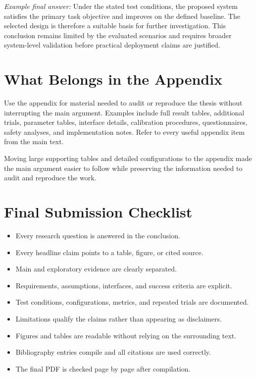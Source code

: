 \documentclass[a4paper,11pt,oneside]{article}
\begin{document}
  \textit{Example final answer:}
  Under the stated test conditions, the proposed system satisfies the primary
  task objective and improves on the defined baseline. The selected design is
  therefore a suitable basis for further investigation. This conclusion remains
  limited by the evaluated scenarios and requires broader system-level
  validation before practical deployment claims are justified.

  \newpage
  \nocite{siciliano2016springer,thrun2005probabilistic,russell2021artificial}
  \printbibliography

  \clearpage
  \appendix

  \section{What Belongs in the Appendix}

  \begin{guidance}
  Use the appendix for material needed to audit or reproduce the thesis without
  interrupting the main argument. Examples include full result tables,
  additional trials, parameter tables, interface details, calibration
  procedures, questionnaires, safety analyses, and implementation notes. Refer
  to every useful appendix item from the main text.
  \end{guidance}

  \begin{experiencenote}
  Moving large supporting tables and detailed configurations to the appendix
  made the main argument easier to follow while preserving the information
  needed to audit and reproduce the work.
  \end{experiencenote}

  \section{Final Submission Checklist}

  \begin{itemize}
    \item Every research question is answered in the conclusion.
    \item Every headline claim points to a table, figure, or cited source.
    \item Main and exploratory evidence are clearly separated.
    \item Requirements, assumptions, interfaces, and success criteria are explicit.
    \item Test conditions, configurations, metrics, and repeated trials are documented.
    \item Limitations qualify the claims rather than appearing as disclaimers.
    \item Figures and tables are readable without relying on the surrounding text.
    \item Bibliography entries compile and all citations are used correctly.
    \item The final PDF is checked page by page after compilation.
  \end{itemize}
\end{document}
